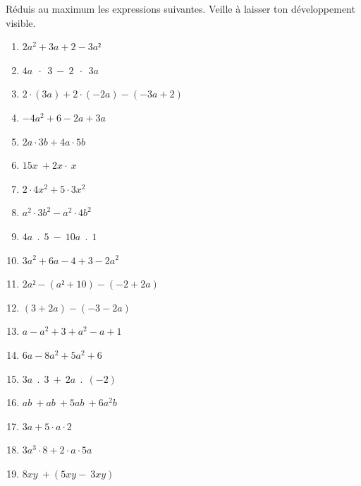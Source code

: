 \documentclass[../../syllabus_1.tex]{subfiles}
\begin{document}
\begin{exercise}
    Réduis au maximum les expressions suivantes. Veille à laisser ton développement visible.
    \begin{enumerate}[cols=2, itemsep=.6cm]
        \item \(2a^{2} + 3a + 2 - 3a²\)
        \item \(4a\ \ \cdot \ \ 3\  - \ 2\ \ \cdot \ \ 3a\)
        \item \(2 \cdot (3a) + 2 \cdot ( - 2a) - ( - 3a + 2)\)
        \item \(- 4a^{2} + 6 - 2a + 3a\)
        \item \(2a\cdot 3b + 4a\cdot 5b \)
        \item \(15x\  + 2x\cdot \ x \)
        \item \(2\cdot 4x^{2} + 5\cdot 3x^{2} \)
        \item \(a^{2}\cdot 3b^{2} - a^{2}\cdot 4b^{2} \)
        \item \(4a\ \ .\ \ 5\  - \ 10a\ \ .\ \ 1\)
        \item \(3a^{2} + 6a - 4 + 3 - 2a^{2}\)
        \item \(2a² - (a² + 10) - ( - 2 + 2a)\)
        \item \((3 + 2a) - ( - 3 - 2a)\)
        \item \(a - a^{2} + 3 + a^{2} - a + 1\)
        \item \(6a - 8a^{2} + 5a^{2} + 6\)
        \item \(3a\ \ .\ \ 3\  + \ 2a\ \ .\ \ ( - 2)\)
        \item \(ab\  + ab\  + 5ab\  + 6a^{2}b \)
        \item \(3a + 5\cdot a\cdot 2 \)
        \item \(3a^{3}\cdot 8 + 2\cdot a\cdot 5a \)
        \item \(8xy\  + (5xy - \ 3xy) \)
    \end{enumerate}
\end{exercise}
\end{document}
